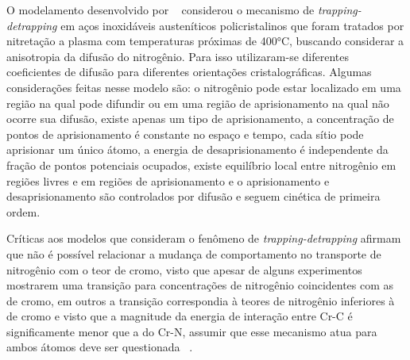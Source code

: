 \documentclass[]{politex}
\begin{document}
	O modelamento desenvolvido por ~\cite{moskalioviene2011modeling} considerou o mecanismo de \textit{trapping-detrapping} em aços inoxidáveis austeníticos policristalinos que foram tratados por nitretação a plasma com temperaturas próximas de 400°C, buscando considerar a anisotropia da difusão do nitrogênio. Para isso utilizaram-se diferentes coeficientes de difusão para diferentes orientações cristalográficas. Algumas considerações feitas nesse modelo são: o nitrogênio pode estar localizado em uma região na qual pode difundir ou em uma região de aprisionamento na qual não ocorre sua difusão, existe apenas um tipo de aprisionamento, a concentração de pontos de aprisionamento é constante no espaço e tempo, cada sítio pode aprisionar um único átomo, a energia de desaprisionamento é independente da fração de pontos potenciais ocupados, existe equilíbrio local entre nitrogênio em regiões livres e em regiões de aprisionamento e o aprisionamento e desaprisionamento são controlados por difusão e seguem cinética de primeira ordem.\par
	Críticas aos modelos que consideram o fenômeno de \textit{trapping-detrapping} afirmam que não é possível relacionar a mudança de comportamento no transporte de nitrogênio com o teor de cromo, visto que apesar de alguns experimentos mostrarem uma transição para concentrações de nitrogênio coincidentes com as de cromo, em outros a transição correspondia à teores de nitrogênio inferiores à de cromo e visto que a magnitude da energia de interação entre Cr-C é significamente menor que a do Cr-N, assumir que esse mecanismo atua para ambos átomos deve ser questionada ~\cite{mandl2002concentration}.
	
\end{document}
